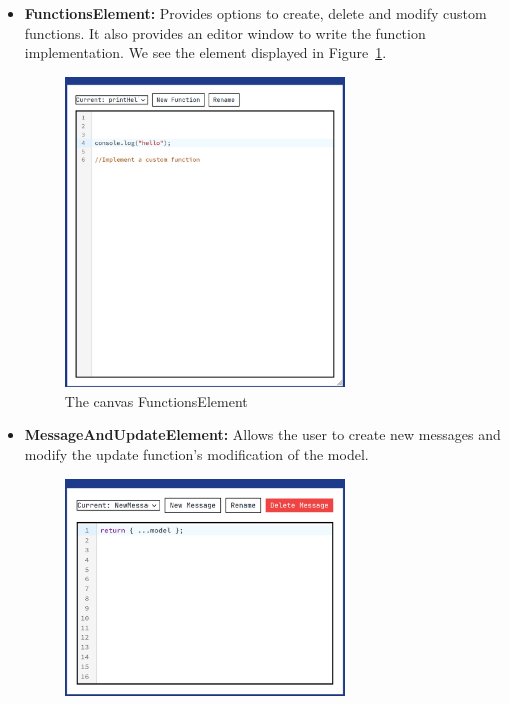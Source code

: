 \begin{itemize}
	\item \textbf{FunctionsElement:} Provides options to create, delete and modify custom functions. It also provides an editor window to write the function implementation. We see the element displayed in Figure~\ref{fig:functions-menu}.
	      \begin{figure}[htbp]
		      \begin{center}
			      \includegraphics[width=0.7\textwidth]{img/function-menu.pdf}
		      \end{center}
		      \caption{The canvas FunctionsElement }\label{fig:functions-menu}
	      \end{figure}
	\item \textbf{MessageAndUpdateElement:} Allows the user to create new messages and modify the update function's modification of the model.
	      \begin{figure}[htbp]
		      \begin{center}
			      \includegraphics[width=0.7\textwidth]{img/message-menu.pdf}

\end{center}
\end{figure}
\end{itemize}
